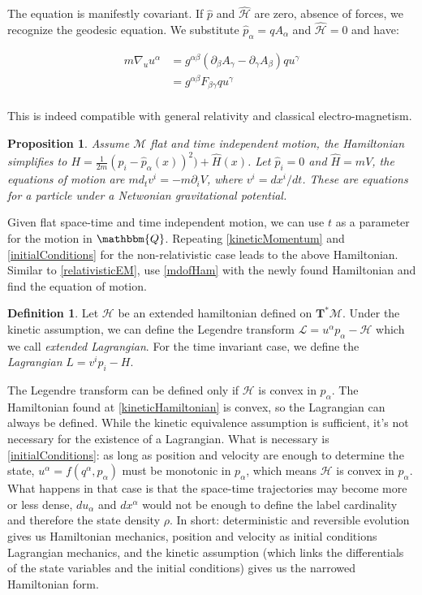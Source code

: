 \documentclass[aps,pra,10pt,twocolumn,floatfix,nofootinbib]{revtex4-1}
\newtheorem{prop}[thm]{Proposition}
\theoremstyle{definition}
\newtheorem{defn}[thm]{Definition}
\begin{document}
The equation is manifestly covariant. If $\hat{p}$ and $\hat{\mathcal{H}}$ are zero, absence of forces, we recognize the geodesic equation. We substitute $\hat{p}_\alpha = q A_\alpha$ and $\hat{\mathcal{H}} = 0$ and have:

\begin{align*}
m \nabla_{u} u^\alpha &= g^{\alpha\beta} (\partial_\beta A_\gamma - \partial_\gamma A_\beta ) q u^\gamma \\
&= g^{\alpha\beta} F_{\beta \gamma} q u^\gamma\\
\end{align*}

This is indeed compatible with general relativity and classical electro-magnetism.

\begin{prop}\label{newtonianGravitation}
Assume $\mathcal{M}$ flat and time independent motion, the Hamiltonian simplifies to $H=\frac{1}{2m}(p_i-\hat{p}_\alpha(x))^2)+\hat{H}(x)$. Let $\hat{p}_i = 0$ and $\hat{H} = mV$, the equations of motion are $m d_t v^i = - m \partial_i V$, where $v^i=dx^i/dt$. These are equations for a particle under a Netwonian gravitational potential.
\end{prop}

Given flat space-time and time independent motion, we can use $t$ as a parameter for the motion in $\mathbbm{Q}$. Repeating \ref{kineticMomentum} and \ref{initialConditions} for the non-relativistic case leads to the above Hamiltonian. Similar to \ref{relativisticEM}, use \ref{mdofHam} with the newly found Hamiltonian and find the equation of motion.

\begin{defn}\label{lagrangian}
Let $\mathcal{H}$ be an extended hamiltonian defined on $\mathbf{T}^*\mathcal{M}$. Under the kinetic assumption, we can define the Legendre transform $\mathcal{L}=u^\alpha p_\alpha - \mathcal{H}$ which we call \emph{extended Lagrangian}. For the time invariant case, we define the \emph{Lagrangian} $L=v^i p_i - H$.
\end{defn}

The Legendre transform can be defined only if $\mathcal{H}$ is convex in $p_\alpha$. The Hamiltonian found at \ref{kineticHamiltonian} is convex, so the Lagrangian can always be defined. While the kinetic equivalence assumption is sufficient, it's not necessary for the existence of a Lagrangian. What is necessary is \ref{initialConditions}: as long as position and velocity are enough to determine the state, $u^\alpha=f(q^\alpha, p_\alpha)$ must be monotonic in $p_\alpha$, which means $\mathcal{H}$ is convex in $p_\alpha$. What happens in that case is that the space-time trajectories may become more or less dense, $du_\alpha$ and $dx^\alpha$ would not be enough to define the label cardinality and therefore the state density $\rho$. In short: deterministic and reversible evolution gives us Hamiltonian mechanics, position and velocity as initial conditions Lagrangian mechanics, and the kinetic assumption (which links the differentials of the state variables and the initial conditions) gives us the narrowed Hamiltonian form.
\end{document}

